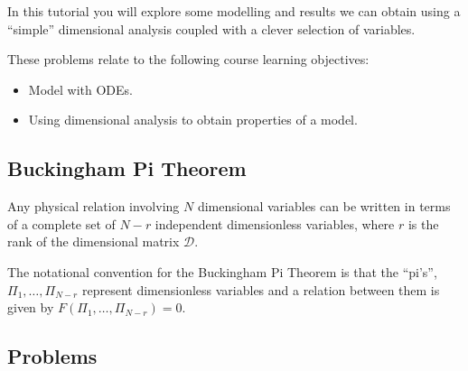 		\begin{objectives}
			In this tutorial you will explore some modelling and results we can obtain using a ``simple'' dimensional analysis coupled with a clever selection of variables.
			
				These problems relate to the following course learning objectives:
				\begin{itemize}\it 
					\item Model with ODEs. \\[-20pt]
					\item Using dimensional analysis to obtain properties of a model.
				\end{itemize}
		\end{objectives}


\vspace{-.5em}
\subsection*{Buckingham Pi Theorem}
\vspace{-.5em}


\begin{definition}
	Any physical relation involving $N$ dimensional variables can be written in terms of a complete set of $N - r$ independent dimensionless variables, where $r$ is the rank of the dimensional matrix $\mathcal{D}$.
		
	The notational convention for the Buckingham Pi Theorem is that the ``pi's'', $\Pi_1,\ldots, \Pi_{N-r}$ represent dimensionless variables and a relation between them is given by $F(\Pi_1,\ldots,\Pi_{N-r}) = 0$.
\end{definition}


\vspace{-.5em}
\subsection*{Problems}
\vspace{-.5em}



